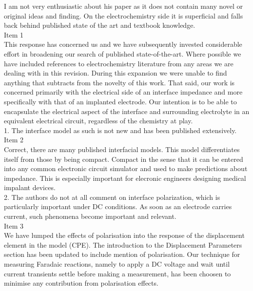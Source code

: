 \documentclass[journal, a4paper]{IEEEtran}
\begin{document}
{\color{blue}
I am not very enthusiastic about his paper as it does not contain many novel or original ideas and finding. On the electrochemistry side it is superficial and falls back behind published state of the art and textbook knowledge.\\
{\color{OliveGreen}
    Item 1\\
    This response has concerned us and we have subsequently invested considerable effort in broadening our search of published state-of-the-art. Where possible we have included references to electrochemistry literature from any areas we are dealing with in this revision. During this expansion we were unable to find anything that subtracts from the novelty of this work. That said, our work is concerned primarily with the electrical side of an interface impedance and more specifically with that of an implanted electrode. Our intention is to be able to encapsulate the electrical aspect of the interface and surrounding electrolyte in an equivalent electrical circuit, regardless of the chemistry at play.
}\\

1. The interface model as such is not new and has been published extensively.\\
{\color{OliveGreen}
    Item 2\\
    Correct, there are many published interfacial models. This model differentiates itself from those by being compact. Compact in the sense that it can be entered into any common electronic circuit simulator and used to make predictions about impedance. This is especially important for elecronic engineers designing medical impalant devices.
}\\

2. The authors do not at all comment on interface polarization, which is particularly important under DC conditions. As soon as an electrode carries current, such phenomena become important and relevant.\\
{\color{OliveGreen}
    Item 3\\
    We have lumped the effects of polarisation into the response of the displacement element in the model (CPE). The introduction to the Displacement Parameters section has been updated to include mention of polarisation. Our technique for measuring Faradaic reactions, namely to apply a DC voltage and wait until current transients settle before making a measurement, has been choosen to minimise any contribution from polarisation effects.
}\\

}
\end{document}
